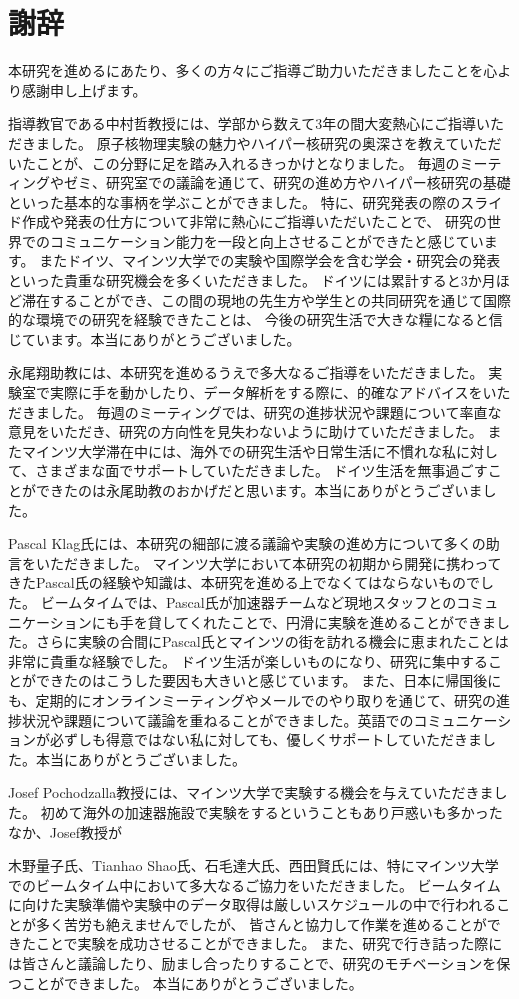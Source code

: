 \documentclass[a4paper,11pt,uplatex]{jsbook}
\begin{document}
\chapter*{謝辞}
本研究を進めるにあたり、多くの方々にご指導ご助力いただきましたことを心より感謝申し上げます。

指導教官である中村哲教授には、学部から数えて3年の間大変熱心にご指導いただきました。
原子核物理実験の魅力やハイパー核研究の奥深さを教えていただいたことが、この分野に足を踏み入れるきっかけとなりました。
毎週のミーティングやゼミ、研究室での議論を通じて、研究の進め方やハイパー核研究の基礎といった基本的な事柄を学ぶことができました。
特に、研究発表の際のスライド作成や発表の仕方について非常に熱心にご指導いただいたことで、
研究の世界でのコミュニケーション能力を一段と向上させることができたと感じています。
またドイツ、マインツ大学での実験や国際学会を含む学会・研究会の発表といった貴重な研究機会を多くいただきました。
ドイツには累計すると3か月ほど滞在することができ、この間の現地の先生方や学生との共同研究を通じて国際的な環境での研究を経験できたことは、
今後の研究生活で大きな糧になると信じています。本当にありがとうございました。

永尾翔助教には、本研究を進めるうえで多大なるご指導をいただきました。
実験室で実際に手を動かしたり、データ解析をする際に、的確なアドバイスをいただきました。
毎週のミーティングでは、研究の進捗状況や課題について率直な意見をいただき、研究の方向性を見失わないように助けていただきました。
またマインツ大学滞在中には、海外での研究生活や日常生活に不慣れな私に対して、さまざまな面でサポートしていただきました。
ドイツ生活を無事過ごすことができたのは永尾助教のおかげだと思います。本当にありがとうございました。



Pascal Klag氏には、本研究の細部に渡る議論や実験の進め方について多くの助言をいただきました。
マインツ大学において本研究の初期から開発に携わってきたPascal氏の経験や知識は、本研究を進める上でなくてはならないものでした。
ビームタイムでは、Pascal氏が加速器チームなど現地スタッフとのコミュニケーションにも手を貸してくれたことで、円滑に実験を進めることができました。さらに実験の合間にPascal氏とマインツの街を訪れる機会に恵まれたことは非常に貴重な経験でした。
ドイツ生活が楽しいものになり、研究に集中することができたのはこうした要因も大きいと感じています。
また、日本に帰国後にも、定期的にオンラインミーティングやメールでのやり取りを通じて、研究の進捗状況や課題について議論を重ねることができました。英語でのコミュニケーションが必ずしも得意ではない私に対しても、優しくサポートしていただきました。本当にありがとうございました。

Josef Pochodzalla教授には、マインツ大学で実験する機会を与えていただきました。
初めて海外の加速器施設で実験をするということもあり戸惑いも多かったなか、Josef教授が

木野量子氏、Tianhao Shao氏、石毛達大氏、西田賢氏には、特にマインツ大学でのビームタイム中において多大なるご協力をいただきました。
ビームタイムに向けた実験準備や実験中のデータ取得は厳しいスケジュールの中で行われることが多く苦労も絶えませんでしたが、
皆さんと協力して作業を進めることができたことで実験を成功させることができました。
また、研究で行き詰った際には皆さんと議論したり、励まし合ったりすることで、研究のモチベーションを保つことができました。
本当にありがとうございました。
\end{document}
